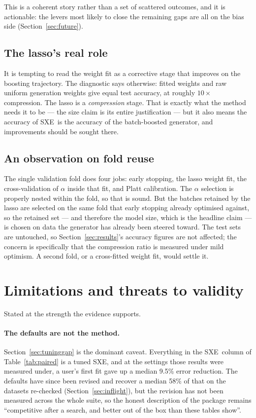 \documentclass[11pt,a4paper]{article}
\newcommand{\SXE}{\textsc{SXE}}
\theoremstyle{definition}
\begin{document}
This is a coherent story rather than a set of scattered outcomes, and it is
actionable: the levers most likely to close the remaining gaps are all on the
bias side (Section~\ref{sec:future}).

\subsection{The lasso's real role}

It is tempting to read the weight fit as a corrective stage that improves on
the boosting trajectory. The diagnostic says otherwise: fitted weights and raw
uniform generation weights give equal test accuracy, at roughly $10\times$
compression. The lasso is a \emph{compression} stage. That is exactly what the
method needs it to be --- the size claim is its entire justification --- but it
also means the accuracy of \SXE\ is the accuracy of the batch-boosted
generator, and improvements should be sought there.

\subsection{An observation on fold reuse}

The single validation fold does four jobs: early stopping, the lasso weight
fit, the cross-validation of $\alpha$ inside that fit, and Platt calibration.
The $\alpha$ selection is properly nested within the fold, so that is sound.
But the batches retained by the lasso are selected on the same fold that early
stopping already optimised against, so the retained set --- and therefore the
model size, which is the headline claim --- is chosen on data the generator has
already been steered toward. The test sets are untouched, so
Section~\ref{sec:results}'s accuracy figures are not affected; the concern is
specifically that the compression ratio is measured under mild optimism. A
second fold, or a cross-fitted weight fit, would settle it.

\section{Limitations and threats to validity}\label{sec:limitations}

Stated at the strength the evidence supports.

\paragraph{The defaults are not the method.} Section~\ref{sec:tuninggap} is the
dominant caveat. Everything in the \SXE\ column of Table~\ref{tab:paired} is a
tuned \SXE, and at the settings those results were measured under, a user's
first fit gave up a median 9.5\% error reduction. The defaults have since been
revised and recover a median 58\% of that on the datasets re-checked
(Section~\ref{sec:inflight}), but the revision has not been measured across the
whole suite, so the honest description of the package remains ``competitive
after a search, and better out of the box than these tables show''.
\end{document}
